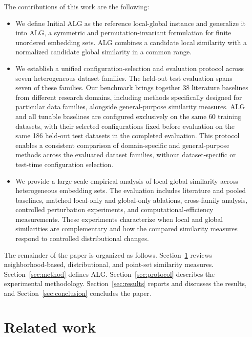 \documentclass[preprint,12pt]{elsarticle}
\begin{document}
\noindent  The contributions of this work are the following:
\begin{itemize}

    \item We define Initial ALG as the reference local-global instance and
    generalize it into ALG, a symmetric and permutation-invariant formulation
    for finite unordered embedding sets. ALG combines a candidate local
    similarity with a normalized candidate global similarity in a common
    range.

    \item We establish a unified configuration-selection and evaluation
    protocol across seven heterogeneous dataset families. The held-out test
    evaluation spans seven of these families. Our
    benchmark brings together 38 literature baselines
    from different research domains, including methods specifically
    designed for particular data families, alongside general-purpose
    similarity measures. ALG and all tunable baselines are configured
    exclusively on the same 60 training datasets, with their
    selected configurations fixed before evaluation on the same
    186 held-out test datasets in the completed evaluation. This protocol
    enables a consistent
    comparison of domain-specific and general-purpose methods across
    the evaluated dataset families, without dataset-specific or test-time
    configuration selection.

    \item We provide a large-scale empirical analysis of local-global
    similarity across heterogeneous embedding sets. The evaluation includes
    literature and pooled baselines, matched local-only and global-only
    ablations, cross-family analysis, controlled perturbation experiments,
    and computational-efficiency measurements. These experiments characterize
    when local and global similarities are complementary and how the compared
    similarity measures respond to controlled distributional changes.

\end{itemize}

The remainder of the paper is organized as follows.
Section~\ref{sec:related} reviews neighborhood-based, distributional, and
point-set similarity measures. Section~\ref{sec:method} defines ALG.
Section~\ref{sec:protocol} describes the experimental methodology.
Section~\ref{sec:results} reports and discusses the results, and
Section~\ref{sec:conclusion} concludes the paper.

\section{Related work}
\label{sec:related}
\end{document}
